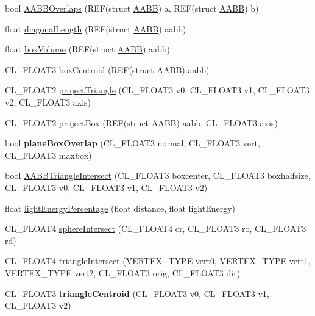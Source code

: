 \begin{DoxyCompactItemize}
\item 
bool \hyperlink{group__g11_ga62fd7d801fbcac08fe1ae521b3aa6807}{A\+A\+B\+B\+Overlaps} (R\+EF(struct \hyperlink{struct_a_a_b_b}{A\+A\+BB}) a, R\+EF(struct \hyperlink{struct_a_a_b_b}{A\+A\+BB}) b)
\item 
float \hyperlink{group__g11_ga4b47e6b8ba1882a00b7fd38a23472a40}{diagonal\+Length} (R\+EF(struct \hyperlink{struct_a_a_b_b}{A\+A\+BB}) aabb)
\item 
float \hyperlink{group__g11_ga412e039493a87f2567e0e1b183fff568}{box\+Volume} (R\+EF(struct \hyperlink{struct_a_a_b_b}{A\+A\+BB}) aabb)
\item 
C\+L\+\_\+\+F\+L\+O\+A\+T3 \hyperlink{group__g11_ga7d7ccd70c8a5cf7752ed34398081c607}{box\+Centroid} (R\+EF(struct \hyperlink{struct_a_a_b_b}{A\+A\+BB}) aabb)
\item 
C\+L\+\_\+\+F\+L\+O\+A\+T2 \hyperlink{group__g11_ga1ffa48cc95c3fa9e290d3adc8338398b}{project\+Triangle} (C\+L\+\_\+\+F\+L\+O\+A\+T3 v0, C\+L\+\_\+\+F\+L\+O\+A\+T3 v1, C\+L\+\_\+\+F\+L\+O\+A\+T3 v2, C\+L\+\_\+\+F\+L\+O\+A\+T3 axis)
\item 
C\+L\+\_\+\+F\+L\+O\+A\+T2 \hyperlink{group__g11_gaa4001e65e8afe90e90945723654fcefa}{project\+Box} (R\+EF(struct \hyperlink{struct_a_a_b_b}{A\+A\+BB}) aabb, C\+L\+\_\+\+F\+L\+O\+A\+T3 axis)
\item 
bool {\bfseries plane\+Box\+Overlap} (C\+L\+\_\+\+F\+L\+O\+A\+T3 normal, C\+L\+\_\+\+F\+L\+O\+A\+T3 vert, C\+L\+\_\+\+F\+L\+O\+A\+T3 maxbox)\hypertarget{group__g11_ga6b0993ffac5239684dabe7683a042f66}{}\label{group__g11_ga6b0993ffac5239684dabe7683a042f66}

\item 
bool \hyperlink{group__g11_ga2b69374423be904cfe32c41bb8c1b75c}{A\+A\+B\+B\+Triangle\+Intersect} (C\+L\+\_\+\+F\+L\+O\+A\+T3 boxcenter, C\+L\+\_\+\+F\+L\+O\+A\+T3 boxhalfsize, C\+L\+\_\+\+F\+L\+O\+A\+T3 v0, C\+L\+\_\+\+F\+L\+O\+A\+T3 v1, C\+L\+\_\+\+F\+L\+O\+A\+T3 v2)
\item 
float \hyperlink{group__g11_gadddf7735ad6bfbc41d484d8d3719b9dd}{light\+Energy\+Percentage} (float distance, float light\+Energy)
\item 
C\+L\+\_\+\+F\+L\+O\+A\+T4 \hyperlink{group__g11_ga58f6a1b6a599338c9a6fcb5a6d029bd6}{sphere\+Intersect} (C\+L\+\_\+\+F\+L\+O\+A\+T4 cr, C\+L\+\_\+\+F\+L\+O\+A\+T3 ro, C\+L\+\_\+\+F\+L\+O\+A\+T3 rd)
\item 
C\+L\+\_\+\+F\+L\+O\+A\+T4 \hyperlink{group__g11_ga0f8b89073bf883b72ec999c14f4f99d8}{triangle\+Intersect} (V\+E\+R\+T\+E\+X\+\_\+\+T\+Y\+PE vert0, V\+E\+R\+T\+E\+X\+\_\+\+T\+Y\+PE vert1, V\+E\+R\+T\+E\+X\+\_\+\+T\+Y\+PE vert2, C\+L\+\_\+\+F\+L\+O\+A\+T3 orig, C\+L\+\_\+\+F\+L\+O\+A\+T3 dir)
\item 
C\+L\+\_\+\+F\+L\+O\+A\+T3 {\bfseries triangle\+Centroid} (C\+L\+\_\+\+F\+L\+O\+A\+T3 v0, C\+L\+\_\+\+F\+L\+O\+A\+T3 v1, C\+L\+\_\+\+F\+L\+O\+A\+T3 v2)\hypertarget{group__g11_ga4c33f615dfe1dfb29b97b0979532e20f}{}\label{group__g11_ga4c33f615dfe1dfb29b97b0979532e20f}

\end{DoxyCompactItemize}
